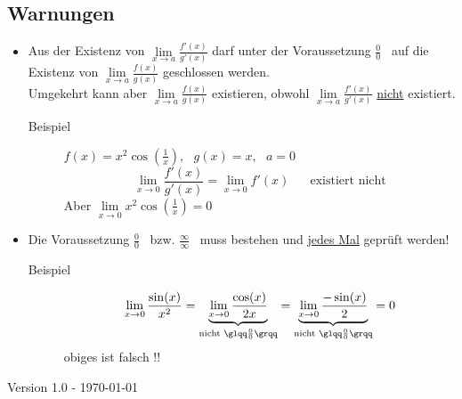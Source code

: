 \documentclass{scrartcl}
\begin{document}
	\subsection*{Warnungen}
		\begin{itemize}
			\item
				Aus der Existenz von $ \lim\limits_{x \to a} \frac{f'(x)}{g'(x)} $ darf unter der Voraussetzung
				\glqq$\frac{0}{0}$\grqq ~ auf die Existenz von $ \lim\limits_{x \to a} \frac{f(x)}{g(x)} $ geschlossen werden.\\
				Umgekehrt kann aber $ \lim\limits_{x \to a} \frac{f(x)}{g(x)} $ existieren, obwohl
				$ \lim\limits_{x \to a} \frac{f'(x)}{g'(x)} $ \underline{nicht} existiert. \\
				
				\begin{description}
					\item[Beispiel]
					$f(x) = x^2 \cos(\frac{1}{x}), ~~~ g(x) = x, ~~~ a = 0$\\
					\[
						\lim\limits_{x \to 0} \frac{f'(x)}{g'(x)} = \lim\limits_{x \to 0} f'(x) 
						~~~~~~ \text{ existiert nicht}
					\]
					Aber $\lim\limits_{x \to 0} x^2 \cos(\frac{1}{x}) = 0$
				\end{description}
				
			\item
				Die Voraussetzung \glqq$\frac{0}{0}$\grqq ~ bzw. \glqq$\frac{\infty}{\infty}$\grqq ~
				muss bestehen und \underline{jedes Mal} geprüft werden!\\
			
				\begin{description}
					\item[Beispiel]
						{\color{red}
						\[
							\lim\limits_{ x \to 0} \frac{\sin(x)}{x^2} = 
							\underbrace{\lim\limits_{ x \to 0} \frac{\cos(x)}{2x}}_{ \text{nicht } \glqq\frac{0}{0}\grqq } =
							\underbrace{\lim\limits_{ x \to 0} \frac{- \sin(x)}{2}}_{ \text{nicht } \glqq\frac{0}{0}\grqq } = 0
						\]
						{\tiny obiges ist falsch !!}
						}
						
				\end{description}	
			
		\end{itemize}

		{\tiny
			Version 1.0 - \today
		}
\end{document}
